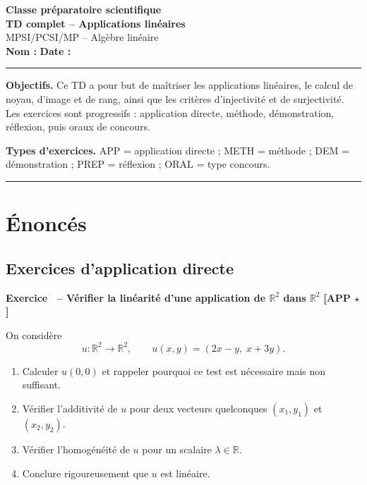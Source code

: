 \documentclass[11pt,a4paper]{article}
\newcounter{exo}
\newcommand{\exo}[3]{
    \refstepcounter{exo}
    \vspace{0.45cm}
    \noindent
    \colorbox{grisclair}{
    \parbox{0.965\linewidth}{
    \textbf{\textcolor{bleuprepa}{Exercice \theexo\ -- #1}}
    \hfill
    \textbf{[#2 \; #3]}
    }}
    \vspace{0.15cm}
}
\newcommand{\R}{\mathbb{R}}
\begin{document}
\begin{center}
    {\Large \textbf{Classe préparatoire scientifique}}\\[0.2cm]
    {\Huge \textbf{\textcolor{bleuprepa}{TD complet -- Applications linéaires}}}\\[0.2cm]
    {\Large MPSI/PCSI/MP -- Algèbre linéaire}\\[0.25cm]
    \textbf{Nom :} \underline{\hspace{5cm}}
    \hfill
    \textbf{Date :} \underline{\hspace{3cm}}
\end{center}

\vspace{0.35cm}
\hrule
\vspace{0.25cm}

\noindent\textbf{Objectifs.}
Ce TD a pour but de maîtriser les applications linéaires, le calcul de noyau, d'image et de rang, ainsi que les critères d'injectivité et de surjectivité. Les exercices sont progressifs : application directe, méthode, démonstration, réflexion, puis oraux de concours.

\vspace{0.2cm}
\noindent\textbf{Types d'exercices.}
APP = application directe ; METH = méthode ; DEM = démonstration ; PREP = réflexion ; ORAL = type concours.

\vspace{0.25cm}
\hrule

\tableofcontents
\newpage

\section{Énoncés}

\subsection{Exercices d'application directe}

\exo{Vérifier la linéarité d'une application de $\R^2$ dans $\R^2$}{APP}{$\star$}
On considère
\[
u:\R^2\to\R^2,\qquad u(x,y)=(2x-y,\;x+3y).
\]
\begin{enumerate}
    \item Calculer $u(0,0)$ et rappeler pourquoi ce test est nécessaire mais non suffisant.
    \item Vérifier l'additivité de $u$ pour deux vecteurs quelconques $(x_1,y_1)$ et $(x_2,y_2)$.
    \item Vérifier l'homogénéité de $u$ pour un scalaire $\lambda\in\R$.
    \item Conclure rigoureusement que $u$ est linéaire.
\end{enumerate}
\end{document}
